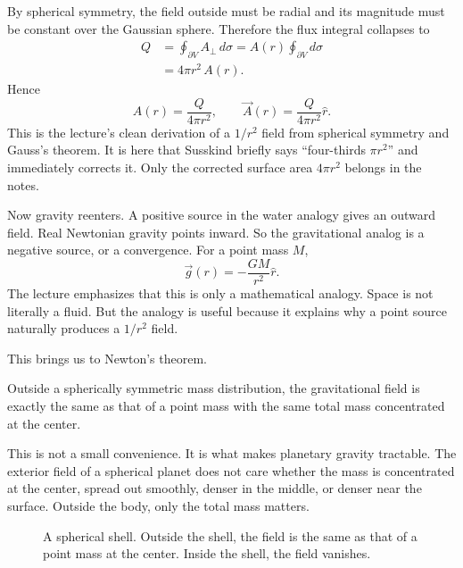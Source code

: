 By spherical symmetry, the field outside must be radial and its magnitude must be constant over the Gaussian sphere. Therefore the flux integral collapses to
\begin{align}
Q
&=
\oint_{\partial V} A_\perp\,d\sigma
=
A(r)\oint_{\partial V} d\sigma \\
&= 4\pi r^2\,A(r).
\end{align}
Hence
\begin{equation}
A(r)=\frac{Q}{4\pi r^2},
\qquad
\vec A(r)=\frac{Q}{4\pi r^2}\hat r.
\end{equation}
This is the lecture's clean derivation of a \(1/r^2\) field from spherical symmetry and Gauss's theorem. It is here that Susskind briefly says ``four-thirds \(\pi r^2\)'' and immediately corrects it. Only the corrected surface area \(4\pi r^2\) belongs in the notes.

Now gravity reenters. A positive source in the water analogy gives an outward field. Real Newtonian gravity points inward. So the gravitational analog is a negative source, or a convergence. For a point mass \(M\),
\begin{equation}
\vec g(r)=-\frac{GM}{r^2}\hat r.
\end{equation}
The lecture emphasizes that this is only a mathematical analogy. Space is not literally a fluid. But the analogy is useful because it explains why a point source naturally produces a \(1/r^2\) field.

This brings us to Newton's theorem.

\begin{proposition}
Outside a spherically symmetric mass distribution, the gravitational field is exactly the same as that of a point mass with the same total mass concentrated at the center.
\end{proposition}

This is not a small convenience. It is what makes planetary gravity tractable. The exterior field of a spherical planet does not care whether the mass is concentrated at the center, spread out smoothly, denser in the middle, or denser near the surface. Outside the body, only the total mass matters.

\begin{figure}
\centering
{}
\caption{A spherical shell. Outside the shell, the field is the same as that of a point mass at the center. Inside the shell, the field vanishes.}
\end{figure}

